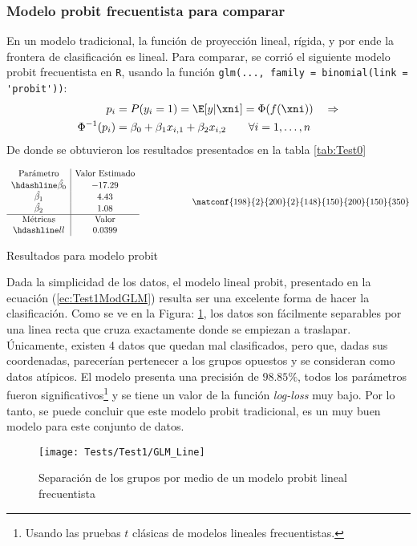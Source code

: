 \subsubsection*{Modelo probit frecuentista para comparar}
En un modelo tradicional, la función de proyección lineal, rígida, y por ende la frontera de clasificación es lineal. Para comparar, se corrió el siguiente modelo probit frecuentista en \verb|R|, usando la función \verb|glm(..., family = binomial(link = 'probit'))|:
\begin{align}
	p_i & = P(y_i = 1) =\E[y|\xni] = \Phi(f(\xni))  \quad \Rightarrow  			\nonumber \\
	\Phi^{-1}(p_i) &= \beta_0 + \beta_1x_{i,1} + \beta_2x_{i,2} 
	\qquad 	\forall i =1,\ldots,n \label{ec:Test1ModGLM}
\end{align}
De donde se obtuvieron los resultados presentados en la tabla \ref{tab:Test0}

\begin{table}[h]
\begin{align*}
\begin{array}{c|c}
\text{Parámetro} &\text{Valor Estimado} \\
\hdashline
\hat{\beta_0} & -17.29 \\
\hat{\beta_1} & 4.43 \\
\hat{\beta_2} & 1.08 \\
\hline
\text{Métricas} & \text{Valor} \\
\hdashline
ll & 0.0399
\end{array}
\qquad\qquad\qquad
\matconf{198}{2}{200}{2}{148}{150}{200}{150}{350}
\end{align*}
\caption{Resultados para modelo probit}
\label{tab:Test0}
\end{table}

Dada la simplicidad de los datos, el modelo lineal probit, presentado en la ecuación (\ref{ec:Test1ModGLM}) resulta ser una excelente forma de hacer la clasificación. Como se ve en la Figura: \ref{fig:Test0ModGLM}, los datos son fácilmente separables por una linea recta que cruza exactamente donde se empiezan a traslapar. Únicamente, existen 4 datos que quedan mal clasificados, pero que, dadas sus coordenadas, parecerían pertenecer a los grupos opuestos y se consideran como datos atípicos. El modelo presenta una precisión de $98.85\%$, todos los parámetros fueron significativos\footnote{Usando las pruebas $t$ clásicas de modelos lineales frecuentistas.} y se tiene un valor de la función \textit{log-loss} muy bajo. Por lo tanto, se puede concluir que este modelo probit tradicional, es un muy buen modelo para este conjunto de datos. 
\begin{figure}[h]
  \centering
      \texttt{[image: Tests/Test1/GLM\_Line]}
  \caption{Separación de los grupos por medio de un modelo probit lineal frecuentista}
 \label{fig:Test0ModGLM}
\end{figure}

